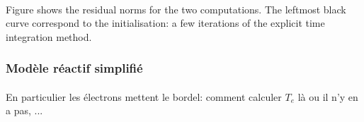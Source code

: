         \paragraph{}
        Figure  shows the residual norms for the two computations.
        The leftmost black curve correspond to the initialisation: a few iterations of the explicit time integration method.



      \subsubsection{Modèle réactif simplifié}

        \paragraph{}
        En particulier les électrons mettent le bordel: comment calculer $T_e$ là ou il n'y en a pas, ...
